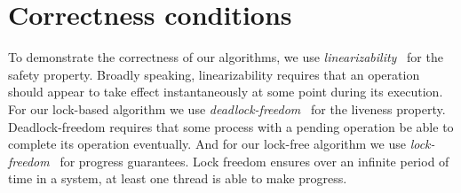 \section{Correctness conditions}
To demonstrate the correctness of our algorithms, we use \emph{linearizability}~\cite{HerWin:1990:TOPLAS} for the safety property. Broadly speaking, linearizability requires that an operation should appear to take effect instantaneously at some point during its execution. For our lock-based algorithm we use \emph{deadlock-freedom}~\cite{HerSha:2012:Book} for the liveness property. Deadlock-freedom requires that some process with a pending operation be able to complete its operation eventually. And for our lock-free algorithm we use \emph{lock-freedom}~\cite{HerSha:2012:Book} for progress guarantees. Lock freedom ensures over an infinite period of time in a system, at least one thread is able to make progress.
